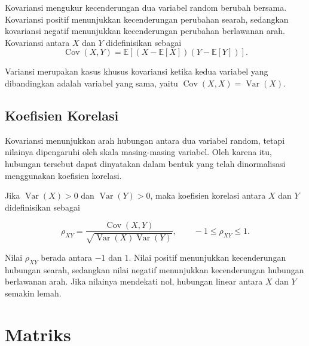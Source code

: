 Kovariansi mengukur kecenderungan dua variabel random berubah bersama. Kovariansi positif menunjukkan kecenderungan perubahan searah, sedangkan kovariansi negatif menunjukkan kecenderungan perubahan berlawanan arah. Kovariansi antara \(X\) dan \(Y\) didefinisikan sebagai
\begin{equation}
\operatorname{Cov}(X,Y)
=
\mathbb{E}\left[(X-\mathbb{E}[X])(Y-\mathbb{E}[Y])\right].
\label{eq:kovariansi}
\end{equation}

Variansi merupakan kasus khusus kovariansi ketika kedua variabel yang dibandingkan adalah variabel yang sama, yaitu \(\operatorname{Cov}(X,X) = \operatorname{Var}(X)\).

\subsection{Koefisien Korelasi}

\label{subsec:korelasi}

Kovariansi menunjukkan arah hubungan antara dua variabel random, tetapi
nilainya dipengaruhi oleh skala masing-masing variabel. Oleh karena itu,
hubungan tersebut dapat dinyatakan dalam bentuk yang telah dinormalisasi
menggunakan koefisien korelasi.

\begin{definisi}

\label{def:korelasi}

Jika $\operatorname{Var}(X)>0$ dan $\operatorname{Var}(Y)>0$, maka koefisien
korelasi antara $X$ dan $Y$ didefinisikan sebagai

\begin{equation}
\rho_{XY}
=
\frac{\operatorname{Cov}(X,Y)}
{\sqrt{\operatorname{Var}(X)\operatorname{Var}(Y)}},
\qquad
-1\leq\rho_{XY}\leq1.
\label{eq:korelasi}
\end{equation}

\end{definisi}

Nilai $\rho_{XY}$ berada antara $-1$ dan $1$. Nilai positif menunjukkan
kecenderungan hubungan searah, sedangkan nilai negatif menunjukkan
kecenderungan hubungan berlawanan arah. Jika nilainya mendekati nol, hubungan
linear antara $X$ dan $Y$ semakin lemah.


\section{Matriks}
\label{sec:matriks}

